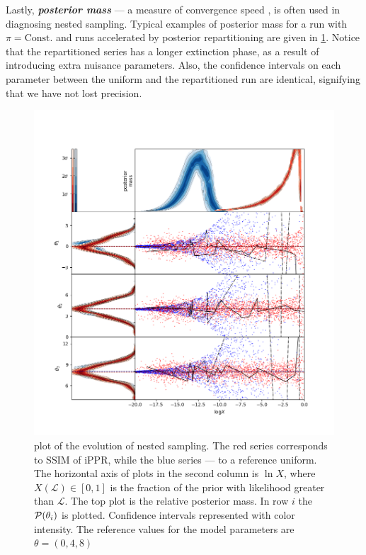 \documentclass[usenatbib]{mnras}
\begin{document}
Lastly, \textbf{\emph{posterior mass}} --- a measure of convergence
speed \citep{higson2018nestcheck}, is often used in diagnosing nested
sampling. Typical examples of posterior mass for a run with
$\pi=\text{Const.}$ and runs accelerated by posterior repartitioning
are given in \cref{fig:higson}. Notice that the repartitioned series
has a longer extinction phase, as a result of introducing extra
nuisance parameters. Also, the confidence intervals on each parameter
between the uniform and the repartitioned run are identical,
signifying that we have not lost precision.

\begin{figure}
\includegraphics[width=.99\textwidth]{./illustrations/higson.png}
\caption{plot of the evolution of nested sampling. The \color{red} red
  \color{black} series corresponds to SSIM of iPPR, while the
  \color{blue} blue \color{black} series --- to a reference
  uniform. The horizontal axis of plots in the second column is
  \(\ln X\), where \(X(\mathcal{L}) \in [0,1]\) is the fraction of the
  prior with likelihood greater than \(\mathcal{L}\). The top plot is
  the relative posterior mass. In row $i$ the ${\cal P}(\theta_{i})$
  is plotted. Confidence intervals represented with color
  intensity. The reference values for the model parameters are
  \(\theta = (0, 4, 8)\) \label{fig:higson}}
\end{figure}
\end{document}
